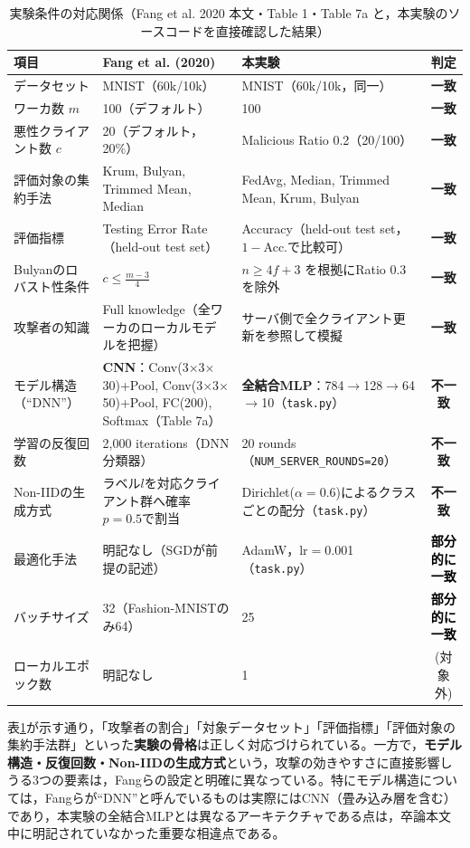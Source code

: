 \documentclass[a4j, twocolumn, dvipdfmx]{jsarticle}
\newcommand{\okmark}{\textcolor{okgreen}{\textbf{一致}}}
\newcommand{\halfmark}{\textcolor{black}{\textbf{部分的に一致}}}
\newcommand{\ngmark}{\textcolor{warnred}{\textbf{不一致}}}
\begin{document}
\begin{table}[t]
\centering
\caption{実験条件の対応関係（Fang et al. 2020 本文・Table 1・Table 7a と，本実験のソースコードを直接確認した結果）}
\label{tab:setting_correspondence}
\footnotesize
\setlength{\tabcolsep}{4pt}
\renewcommand{\arraystretch}{1.15}
\begin{tabular}{@{} p{2.3cm} p{6.5cm} p{5.8cm} c @{}}
\toprule
項目 & Fang et al. (2020) & 本実験 & 判定 \\
\midrule
データセット & MNIST（60k/10k） & MNIST（60k/10k，同一） & \okmark \\
ワーカ数 $m$ & 100（デフォルト） & 100 & \okmark \\
悪性クライアント数 $c$ & 20（デフォルト，20\%） & Malicious Ratio 0.2（20/100） & \okmark \\
評価対象の集約手法 & Krum, Bulyan, Trimmed Mean, Median & FedAvg, Median, Trimmed Mean, Krum, Bulyan & \okmark \\
評価指標 & Testing Error Rate（held-out test set） & Accuracy（held-out test set，$1-$Acc.で比較可） & \okmark \\
Bulyanのロバスト性条件 & $c \leq \frac{m-3}{4}$ & $n \geq 4f+3$ を根拠にRatio 0.3を除外 & \okmark \\
攻撃者の知識 & Full knowledge（全ワーカのローカルモデルを把握） & サーバ側で全クライアント更新を参照して模擬 & \okmark \\
\midrule
モデル構造（``DNN''） & \textbf{CNN}：Conv(3$\times$3$\times$30)+Pool, Conv(3$\times$3$\times$50)+Pool, FC(200), Softmax（Table 7a） & \textbf{全結合MLP}：784$\to$128$\to$64$\to$10（\texttt{task.py}） & \ngmark \\
学習の反復回数 & 2{,}000 iterations（DNN分類器） & 20 rounds（\texttt{NUM\_SERVER\_ROUNDS=20}） & \ngmark \\
Non-IIDの生成方式 & ラベル$l$を対応クライアント群へ確率$p{=}0.5$で割当 & Dirichlet($\alpha{=}0.6$)によるクラスごとの配分（\texttt{task.py}） & \ngmark \\
最適化手法 & 明記なし（SGDが前提の記述） & AdamW，lr$=$0.001（\texttt{task.py}） & \halfmark \\
バッチサイズ & 32（Fashion-MNISTのみ64） & 25 & \halfmark \\
ローカルエポック数 & 明記なし & 1 & (対象外) \\
\bottomrule
\end{tabular}
\end{table}

表\ref{tab:setting_correspondence}が示す通り，「攻撃者の割合」「対象データセット」「評価指標」「評価対象の集約手法群」といった\textbf{実験の骨格}は正しく対応づけられている。一方で，\textbf{モデル構造・反復回数・Non-IIDの生成方式}という，攻撃の効きやすさに直接影響しうる3つの要素は，Fangらの設定と明確に異なっている。特にモデル構造については，Fangらが``DNN''と呼んでいるものは実際にはCNN（畳み込み層を含む）であり，本実験の全結合MLPとは異なるアーキテクチャである点は，卒論本文中に明記されていなかった重要な相違点である。
\end{document}
